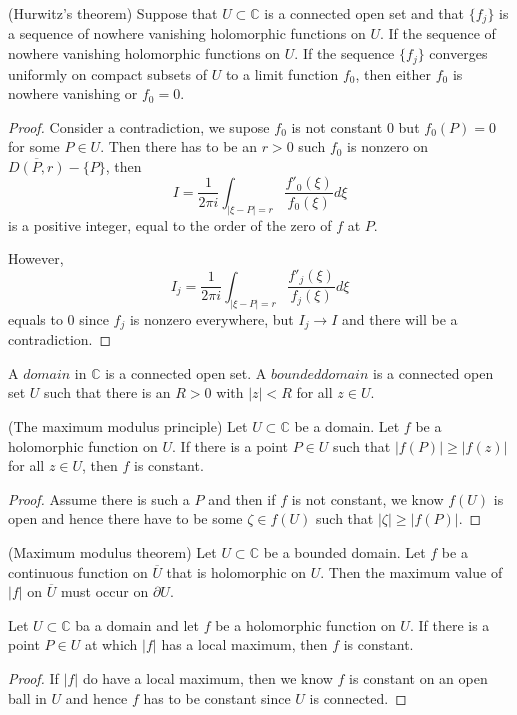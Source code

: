 \documentclass[lang=en, color=blue, ]{elegantbook}
\newcommand{\C}{\mathbb{C}}
\begin{document}
\begin{theorem}
    (Hurwitz's theorem) Suppose that $U\subset\C$ is a connected open set and that $\{f_j\}$ is a sequence of nowhere vanishing holomorphic functions on $U$. If the sequence of nowhere vanishing holomorphic functions on $U$. If the sequence $\{f_j\}$ converges uniformly on compact subsets of $U$ to a limit function $f_0$, then either $f_0$ is nowhere vanishing or $f_0 = 0$.
\end{theorem}
\begin{proof}
    Consider a contradiction, we supose $f_0$ is not constant $0$ but $f_0(P) = 0$ for some $P\in U$. Then there has to be an $r>0$ such $f_0$ is nonzero on $\overline{D(P,r)} - \{P\}$, then
    \[I = \dfrac{1}{2\pi i} \int_{|\xi-P| = r} \dfrac{f'_0(\xi)}{f_0(\xi)} d\xi\]
    is a positive integer, equal to the order of the zero of $f$ at $P$.\par
    However,
    \[I_j = \dfrac{1}{2\pi i} \int_{|\xi-P| = r} \dfrac{f'_j(\xi)}{f_j(\xi)} d\xi\]
    equals to $0$ since $f_j$ is nonzero everywhere, but $I_j \to I$ and there will be a contradiction.
\end{proof}

\begin{definition}
    A $domain$ in $\C$ is a connected open set. A $bounded domain$ is a connected open set $U$ such that there is an $R>0$ with $|z|<R$ for all $z\in U$. 
\end{definition}

\begin{theorem}
    (The maximum modulus principle) Let $U\subset\C$ be a domain. Let $f$ be a holomorphic function on $U$. If there is a point $P\in U$ such that $|f(P)| \geq |f(z)|$ for all $z\in U$, then $f$ is constant.
\end{theorem}
\begin{proof}
    Assume there is such a $P$ and then if $f$ is not constant, we know $f(U)$ is open and hence there have to be some $ \zeta \in f(U)$ such that $|\zeta| \geq |f(P)|$.
\end{proof}

\begin{corollary}
    (Maximum modulus theorem) Let $U\subset\C$ be a bounded domain. Let $f$ be a continuous function on $\overline{U}$ that is holomorphic on $U$. Then the maximum value of $|f|$ on $\overline{U}$ must occur on $\partial U$.
\end{corollary}

\begin{theorem}
    Let $U\subset\C$ ba a domain and let $f$ be a holomorphic function on $U$. If there is a point $P\in U$ at which $|f|$ has a local maximum, then $f$ is constant.
\end{theorem}
\begin{proof}
    If $|f|$ do have a local maximum, then we know $f$ is constant on an open ball in $U$ and hence $f$ has to be constant since $U$ is connected.
\end{proof}
\end{document}
